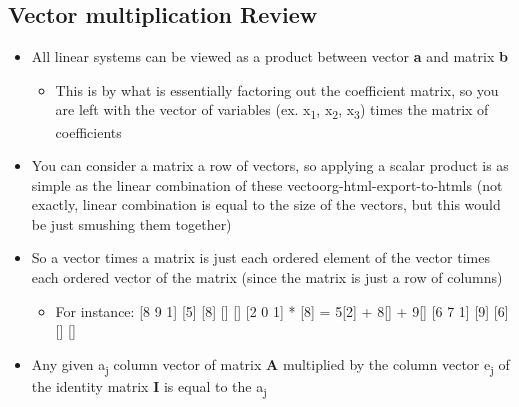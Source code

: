 \documentclass[11pt]{article}
\begin{document}
\subsection{Vector multiplication Review}
\label{sec:orgac29d9b}
\begin{itemize}
\item All linear systems can be viewed as a product between vector \textbf{a} and matrix \textbf{b}
\begin{itemize}
\item This is by what is essentially factoring out the coefficient matrix, so you are left with the vector of variables (ex. x\textsubscript{1}, x\textsubscript{2}, x\textsubscript{3}) times the matrix of coefficients
\end{itemize}
\item You can consider a matrix a row of vectors, so applying a scalar product is as simple as the linear combination of these vectoorg-html-export-to-htmls (not exactly, linear combination is equal to the size of the vectors, but this would be just smushing them together)
\item So a vector times a matrix is just each ordered element of the vector times each ordered vector of the matrix (since the matrix is just a row of columns)
\begin{itemize}
\item For instance:
{[}8 9 1]   [5]      [8]    []    []
{[}2 0 1] * [8]  =  5[2] + 8[] + 9[]
{[}6 7 1]   [9]      [6]    []    []
\end{itemize}
\item Any given a\textsubscript{j} column vector of matrix \textbf{A} multiplied by the column vector e\textsubscript{j} of the identity matrix \textbf{I} is equal to the a\textsubscript{j}
\end{itemize}
\end{document}
